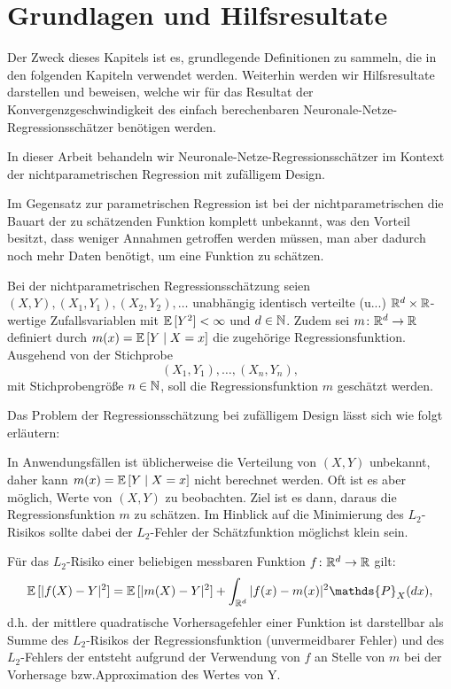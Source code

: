 \chapter{Grundlagen und Hilfsresultate}
\label{chap:1}

Der Zweck dieses Kapitels ist es, grundlegende Definitionen zu sammeln, die in den folgenden Kapiteln verwendet werden. Weiterhin werden wir Hilfsresultate darstellen und beweisen, welche wir für das Resultat der Konvergenzgeschwindigkeit des einfach berechenbaren Neuronale-Netze-Regressionsschätzer benötigen werden.

In dieser Arbeit behandeln wir Neuronale-Netze-Regressionsschätzer im Kontext der nichtparametrischen Regression mit zufälligem Design. 

Im Gegensatz zur parametrischen Regression ist bei der nichtparametrischen die Bauart der zu schätzenden Funktion komplett unbekannt, was den Vorteil besitzt, dass weniger Annahmen getroffen werden müssen, man aber dadurch noch mehr Daten benötigt, um eine Funktion zu schätzen.

Bei der nichtparametrischen Regressionsschätzung seien $(X, Y), (X_1, Y_1), (X_2, Y_2), \dots$ unabhängig identisch verteilte (u.\@i.\@v.\@) $\mathbb{R}^d \times \mathbb{R}$-wertige Zufallsvariablen mit $\mathbb{E}\,[Y^2] < \infty$ und $d \in \mathbb{N}$. Zudem sei $m\colon \mathbb{R}^d \to \mathbb{R}$ definiert durch $m(x) = \mathbb{E}\,[Y \mid X = x]$ die zugehörige Regressionsfunktion. Ausgehend von der Stichprobe
$$ (X_1, Y_1),\dots,(X_n, Y_n),$$ 
mit Stichprobengröße $n \in \mathbb{N}$, soll die Regressionsfunktion $m$ geschätzt werden.

Das Problem der Regressionsschätzung bei zufälligem Design lässt sich wie folgt erläutern: 

In Anwendungsfällen ist üblicherweise die Verteilung von $(X, Y)$ unbekannt, daher kann $m(x) = \mathbb{E}\,[Y \mid X = x]$ nicht berechnet werden. Oft ist es aber möglich, Werte von $(X, Y)$ zu beobachten. Ziel ist es dann, daraus die Regressionsfunktion $m$ zu schätzen. Im Hinblick auf die Minimierung des $L_2$-Risikos sollte dabei der $L_2$-Fehler der Schätzfunktion möglichst klein sein. 

Für das $L_2$-Risiko einer beliebigen messbaren Funktion $f\colon \mathbb{R}^d \to \mathbb{R}$  gilt:
$$\E[|f(X) - Y|^2] = \E[|m(X) - Y|^2] + \int_{\R^d}|f(x) - m(x)|^2 \mathds{P}_X (dx),$$
d.h. der mittlere quadratische Vorhersagefehler einer Funktion ist darstellbar als Summe des $L_2$-Risikos der Regressionsfunktion (unvermeidbarer Fehler) und des $L_2$-Fehlers der entsteht aufgrund der Verwendung von $f$ an Stelle von $m$ bei der Vorhersage bzw.\@ Approximation des Wertes von Y.

